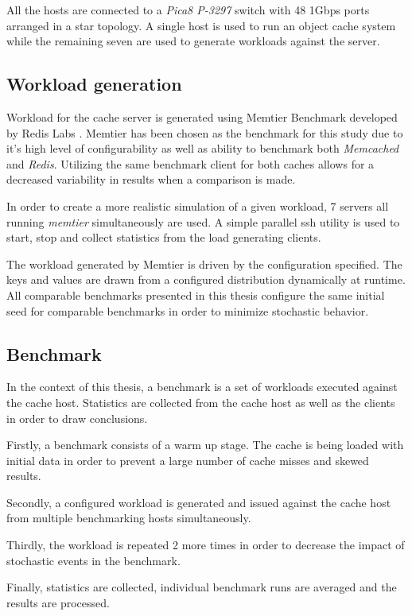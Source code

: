 All the hosts are connected to a \textit{Pica8 P-3297} switch with 48 1Gbps ports arranged in a star topology. A single host is used to run an object cache system while the remaining seven are used to generate workloads against the server.

\subsection{Workload generation}
\label{methodology:workload-gen}
Workload for the cache server is generated using Memtier Benchmark developed by Redis Labs \cite{memtier}. Memtier has been chosen as the benchmark for this study due to it's high level of configurability as well as ability to benchmark both \textit{Memcached} and \textit{Redis}. Utilizing the same benchmark client for both caches allows for a decreased variability in results when a comparison is made.

In order to create a more realistic simulation of a given workload, 7 servers all running \textit{memtier} simultaneously are used. A simple parallel ssh utility is used to start, stop and collect statistics from the load generating clients.

The workload generated by Memtier is driven by the configuration specified. The keys and values are drawn from a configured distribution dynamically at runtime. All comparable benchmarks presented in this thesis configure the same initial seed for comparable benchmarks in order to minimize stochastic behavior.

\subsection{Benchmark}

In the context of this thesis, a benchmark is a set of workloads executed against the cache host. Statistics are collected from the cache host as well as the clients in order to draw conclusions.

Firstly, a benchmark consists of a warm up stage. The cache is being loaded with initial data in order to prevent a large number of cache misses and skewed results.

Secondly, a configured workload is generated and issued against the cache host from multiple benchmarking hosts simultaneously.

Thirdly, the workload is repeated 2 more times in order to decrease the impact of stochastic events in the benchmark.

Finally, statistics are collected, individual benchmark runs are averaged and the results are processed.



